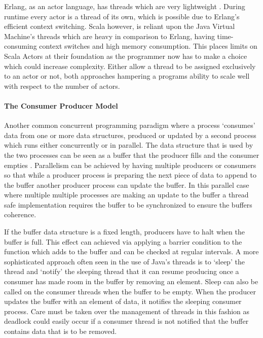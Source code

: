\documentclass[main.tex]{subfiles}
\begin{document}
{{Erlang, as an actor language, has threads which are very lightweight \cite{Armstrong2007}. During runtime every actor is a thread of its own, which is possible due to Erlang's efficient context switching. Scala however, is reliant upon the Java Virtual Machine's threads which are heavy in comparison to Erlang, having time-consuming context switches and high memory consumption\cite{Haller2006}. This places limits on Scala Actors at their foundation as the programmer now has to make a choice which could increase complexity. Either allow a thread to be assigned exclusively to an actor or not, both approaches hampering a programs ability to scale well with respect to the number of actors.

\paragraph{The Consumer Producer Model} Another common concurrent programming paradigm where a process `consumes' data from one or more data structures, produced or updated by a second process  which runs either concurrently or in parallel. The data structure that is used by the two processes can be seen as a buffer that the producer fills and the consumer empties \cite{Trinder1998}. Parallelism can be achieved by having multiple producers or consumers so that while a producer process is preparing the next piece of data to append to the buffer another producer process can update the buffer. In this parallel case where multiple multiple processes are making an update to the buffer a thread safe implementation requires the buffer to be synchronized to ensure the buffers coherence.

If the buffer data structure is a fixed length, producers have to halt when the buffer is full. This effect can achieved via applying a barrier condition to the function which adds to the buffer and can be checked at regular intervals.  A more sophisticated approach often seen in the use of Java's threads is to `sleep' the thread and `notify' the sleeping thread that it can resume producing once a consumer has made room in the buffer by removing an element. Sleep can also be called on the consumer threads when the buffer to be empty. When the producer updates the buffer with an element of data, it notifies the sleeping consumer process. Care must be taken over the management of threads in this fashion as deadlock could easily occur if a consumer thread is not notified that the buffer contains data that is to be removed. 

}}
\end{document}
